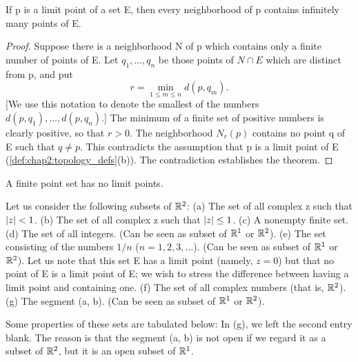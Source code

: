 \begin{theorem} %
  \label{thm:chap2:limit_point_infinite}
  If p is a limit point of a set E, then every neighborhood of p
  contains infinitely many points of E.
  \begin{proof}
    Suppose there is a neighborhood N of p which contains only a
    finite number of points of E. Let $q_1, \dots, q_n$ be those
    points of $N \cap E$ which are distinct from p, and put
    \[ r = \min_{1 \le m \le n} d(p, q_m). \]
    [We use this notation to denote the smallest of the numbers $d(p,
    q_1), \dots, d(p, q_n)$.] The minimum of a finite set of positive
    numbers is clearly positive, so that $r > 0$.
    The neighborhood $N_r(p)$ contains no point q of E such that $q
    \ne p$. This contradicts the assumption that p is a limit point
    of E (\autoref{def:chap2:topology_defs}(b)). The contradiction
    establishes the theorem.
  \end{proof}
\end{theorem}

\begin{corollary} %
  \label{cor:chap2:finite_set_no_limit_points}
  A finite point set has no limit points.
\end{corollary}

\begin{example} %
  \label{ex:chap2:set_property_examples}
  Let us consider the following subsets of $\mathbb{R}^2$:
  (a) The set of all complex z such that $\left\lvert z \right\rvert < 1$.
  (b) The set of all complex z such that $\left\lvert z \right\rvert \le 1$.
  (c) A nonempty finite set.
  (d) The set of all integers. (Can be seen as subset of $\mathbb{R}^1$ or $\mathbb{R}^2$).
  (e) The set consisting of the numbers $1/n$ ($n=1, 2, 3, \dots$).
  (Can be seen as subset of $\mathbb{R}^1$ or $\mathbb{R}^2$). Let us note that this
  set E has a limit point (namely, $z=0$) but that no point of E is a
  limit point of E; we wish to stress the difference between having a
  limit point and containing one.
  (f) The set of all complex numbers (that is, $\mathbb{R}^2$).
  (g) The segment (a, b). (Can be seen as subset of $\mathbb{R}^1$ or $\mathbb{R}^2$).

  Some properties of these sets are tabulated below:
  In (g), we left the second entry blank. The reason is that the
  segment (a, b) is not open if we regard it as a subset of $\mathbb{R}^2$,
  but it is an open subset of $\mathbb{R}^1$.
\end{example}

